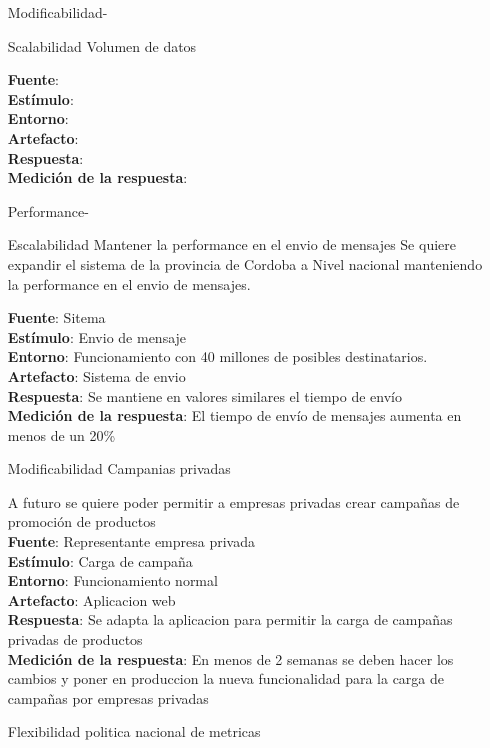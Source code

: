 \documentclass[a4paper, 11pt]{article}
\begin{document}
\begin{itemize}
\item[Modificabilidad-]
\item[Scalabilidad] Volumen de datos

\textbf{Fuente}:  \\
\textbf{Estímulo}: \\
\textbf{Entorno}: \\
\textbf{Artefacto}: \\
\textbf{Respuesta}: \\
\textbf{Medición de la respuesta}: \\

\item[Performance-]
\item[Escalabilidad] Mantener la performance en el envio de mensajes
Se quiere expandir el sistema de la provincia de Cordoba a Nivel nacional manteniendo la performance en el envio de mensajes.

\textbf{Fuente}: Sitema \\
\textbf{Estímulo}: Envio de mensaje \\
\textbf{Entorno}: Funcionamiento con 40 millones de posibles destinatarios. \\
\textbf{Artefacto}: Sistema de envio \\
\textbf{Respuesta}: Se mantiene en valores similares el tiempo de envío \\
\textbf{Medición de la respuesta}: El tiempo de envío de mensajes aumenta en menos de un 20\% \\

\item[Modificabilidad] Campanias privadas

A futuro se quiere poder permitir a empresas privadas crear campañas de promoción de productos \\
\textbf{Fuente}: Representante empresa privada \\
\textbf{Estímulo}: Carga de campaña \\
\textbf{Entorno}: Funcionamiento normal \\
\textbf{Artefacto}: Aplicacion web \\
\textbf{Respuesta}: Se adapta la aplicacion para permitir la carga de campañas privadas de productos \\
\textbf{Medición de la respuesta}: En menos de 2 semanas se deben hacer los cambios y poner en produccion la nueva funcionalidad para la carga de campañas por empresas privadas \\

\item[Flexibilidad] politica nacional de metricas


\end{itemize}
\end{document}
